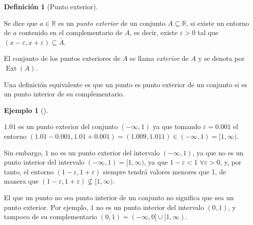 \documentclass[
  a4paper,
]{scrreport}
\theoremstyle{plain}
\theoremstyle{plain}
\theoremstyle{definition}
\newtheorem{definition}{Definición}[chapter]
\theoremstyle{definition}
\newtheorem{example}{Ejemplo}[chapter]
\theoremstyle{plain}
\theoremstyle{definition}
\theoremstyle{remark}
\begin{document}
\begin{definition}[Punto
exterior]\protect\hypertarget{def-punto-exterior}{}\label{def-punto-exterior}

Se dice que \(a\in \mathbb{R}\) es un \emph{punto exterior} de un
conjunto \(A\subseteq \mathbb{R}\), si existe un entorno de \(a\)
contenido en el complementario de \(A\), es decir, existe
\(\varepsilon>0\) tal que
\((x-\varepsilon, x+\varepsilon) \subseteq \overline A\).

El conjunto de los puntos exteriores de \(A\) se llama \emph{exterior}
de \(A\) y se denota por \(\operatorname{Ext}(A)\).

\end{definition}

Una definición equivalente es que un punto es punto exterior de un
conjunto si es un punto interior de su complementario.

\begin{example}[]\protect\hypertarget{exm-punto-exterior}{}\label{exm-punto-exterior}

\(1.01\) es un punto exterior del conjunto \((-\infty, 1)\) ya que
tomando \(\varepsilon=0.001\) el entorno
\((1.01-0.001, 1.01+0.001)=(1.009, 1.011)\in \overline{(-\infty, 1)}=[1,\infty)\).

Sin embargo, \(1\) no es un punto exterior del intervalo
\((-\infty, 1)\), ya que no es un punto interior del intervalo
\(\overline{(-\infty, 1)}=[1,\infty)\), ya que \(1-\varepsilon < 1\)
\(\forall \varepsilon>0\), y, por tanto, el entorno
\((1-\varepsilon, 1+\varepsilon)\) siempre tendrá valores menores que 1,
de manera que
\((1-\varepsilon, 1+\varepsilon)\not \subseteq [1,\infty)\).

\end{example}

\begin{tcolorbox}[enhanced jigsaw, rightrule=.15mm, toptitle=1mm, colbacktitle=quarto-callout-warning-color!10!white, bottomrule=.15mm, opacityback=0, arc=.35mm, breakable, toprule=.15mm, left=2mm, coltitle=black, colback=white, opacitybacktitle=0.6, titlerule=0mm, colframe=quarto-callout-warning-color-frame, bottomtitle=1mm, title=\textcolor{quarto-callout-warning-color}{\faExclamationTriangle}\hspace{0.5em}{Advertencia}, leftrule=.75mm]

El que un punto no sea punto interior de un conjunto no significa que
sea un punto exterior. Por ejemplo, \(1\) no es un punto interior del
intervalo \((0,1)\), y tampoco de su complementario
\(\overline{(0,1)}=(-\infty, 0]\cup[1,\infty)\).

\end{tcolorbox}
\end{document}
